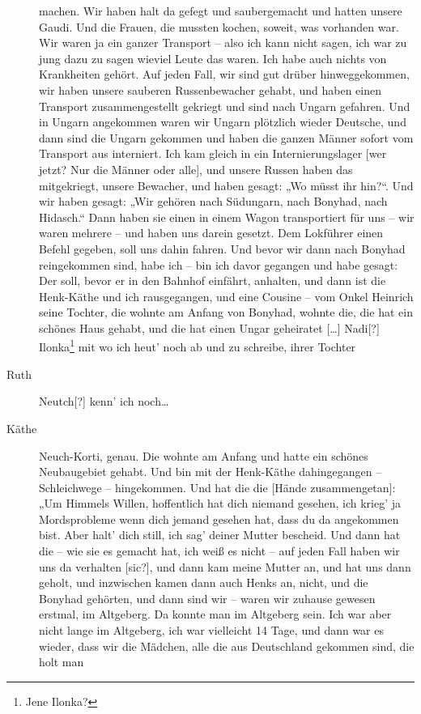 \documentclass[ngerman,]{article}
\begin{document}
\begin{multicols}{3}
\begin{description}
machen. Wir haben halt da gefegt und saubergemacht und hatten unsere
Gaudi. Und die Frauen, die mussten kochen, soweit, was vorhanden war.
Wir waren ja ein ganzer Transport – also ich kann nicht sagen, ich war
zu jung dazu zu sagen wieviel Leute das waren. Ich habe auch nichts von
Krankheiten gehört. Auf jeden Fall, wir sind gut drüber hinweggekommen,
wir haben unsere sauberen Russenbewacher gehabt, und haben einen
Transport zusammengestellt gekriegt und sind nach Ungarn gefahren. Und
in Ungarn angekommen waren wir Ungarn plötzlich wieder Deutsche, und
dann sind die Ungarn gekommen und haben die ganzen Männer sofort vom
Transport aus interniert. Ich kam gleich in ein Internierungslager
{[}wer jetzt? Nur die Männer oder alle{]}, und unsere Russen haben das
mitgekriegt, unsere Bewacher, und haben gesagt: „Wo müsst ihr hin?“. Und
wir haben gesagt: „Wir gehören nach Südungarn, nach Bonyhad, nach
Hidasch.“ Dann haben sie einen in einem Wagon transportiert für uns –
wir waren mehrere – und haben uns darein gesetzt. Dem Lokführer einen
Befehl gegeben, soll uns dahin fahren. Und bevor wir dann nach Bonyhad
reingekommen sind, habe ich – bin ich davor gegangen und habe gesagt:
Der soll, bevor er in den Bahnhof einfährt, anhalten, und dann ist die
Henk-Käthe und ich rausgegangen, und eine Cousine – vom Onkel Heinrich
seine Tochter, die wohnte am Anfang von Bonyhad, wohnte die, die hat ein
schönes Haus gehabt, und die hat einen Ungar geheiratet {[}\ldots{}{]}
Nadi{[}?{]} Ilonka\footnote{Jene Ilonka?} mit wo ich heut' noch ab und
zu schreibe, ihrer Tochter
\item[Ruth]
Neutch{[}?{]} kenn' ich noch\ldots{}
\item[Käthe]
Neuch-Korti, genau. Die wohnte am Anfang und hatte ein schönes
Neubaugebiet gehabt. Und bin mit der Henk-Käthe dahingegangen –
Schleichwege – hingekommen. Und hat die die {[}Hände zusammengetan{]}:
„Um Himmels Willen, hoffentlich hat dich niemand gesehen, ich krieg' ja
Mordsprobleme wenn dich jemand gesehen hat, dass du da angekommen bist.
Aber halt' dich still, ich sag' deiner Mutter bescheid. Und dann hat die
– wie sie es gemacht hat, ich weiß es nicht – auf jeden Fall haben wir
uns da verhalten {[}sic?{]}, und dann kam meine Mutter an, und hat uns
dann geholt, und inzwischen kamen dann auch Henks an, nicht, und die
Bonyhad gehörten, und dann sind wir – waren wir zuhause gewesen erstmal,
im Altgeberg. Da konnte man im Altgeberg sein. Ich war aber nicht lange
im Altgeberg, ich war vielleicht 14 Tage, und dann war es wieder, dass
wir die Mädchen, alle die aus Deutschland gekommen sind, die holt man

\end{description}
\end{multicols}
\end{document}

